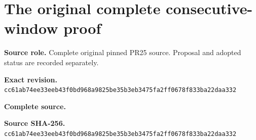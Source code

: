 \begingroup
\sloppy
\small
\clearpage
\section{The original complete consecutive-window proof}
\noindent\textbf{Source role.} Complete original pinned PR25 source. Proposal and adopted status are recorded separately.\par
\noindent\textbf{Exact revision.} \nolinkurl{cc61ab74ee33eeb43f0bd968a9825be35b3eb3475fa2ff0678f833ba22daa332}\par
\noindent\textbf{Complete source.} \par
\noindent\textbf{Source SHA-256.} \nolinkurl{cc61ab74ee33eeb43f0bd968a9825be35b3eb3475fa2ff0678f833ba22daa332}\par\medskip

\endgroup
